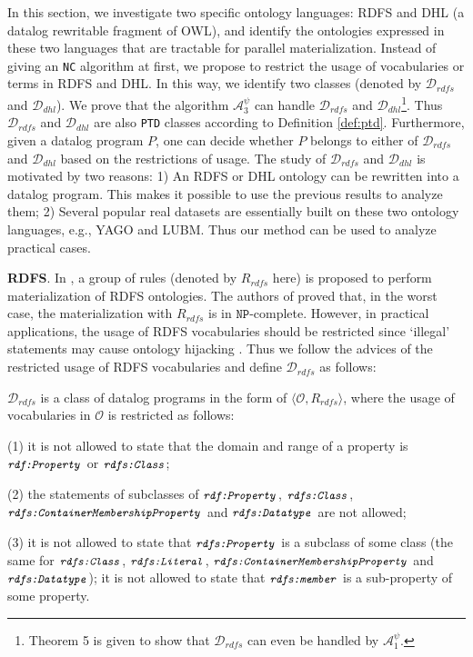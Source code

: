 \documentclass{article}
\begin{document}
In this section, we investigate two specific ontology languages: RDFS and DHL (a datalog rewritable fragment of OWL),
and identify the ontologies expressed in these two languages that are tractable for parallel materialization. Instead
of giving an \texttt{NC} algorithm at first, we propose to restrict the usage of vocabularies or terms in RDFS and DHL. In this way, we identify two classes (denoted by $\mathcal{D}_{rdfs}$ and $\mathcal{D}_{dhl}$). We prove that the algorithm $\mathcal{A}_3^{\psi}$ can handle $\mathcal{D}_{rdfs}$ and $\mathcal{D}_{dhl}$\footnote{Theorem 5 is given to show that $\mathcal{D}_{rdfs}$ can even be handled by $\mathcal{A}_1^{\psi}$.}. Thus $\mathcal{D}_{rdfs}$ and $\mathcal{D}_{dhl}$ are also \texttt{PTD} classes according to Definition \ref{def:ptd}. Furthermore, given a
datalog program $P$, one can decide whether $P$ belongs to either of $\mathcal{D}_{rdfs}$ and $\mathcal{D}_{dhl}$ based on
the restrictions of usage. The study of $\mathcal{D}_{rdfs}$ and $\mathcal{D}_{dhl}$ is motivated by two reasons: 1) An RDFS or DHL ontology can be rewritten into a datalog program. This makes it possible to use the previous results to analyze them; 2) Several popular real datasets are essentially
built on these two ontology languages, e.g., YAGO and LUBM. Thus our method can be used to analyze practical cases.

\textbf{RDFS}. In \cite{rdfSemantic},
a group of rules (denoted by $R_{rdfs}$ here) is proposed to perform materialization of RDFS ontologies.
The authors of \cite{DBLP:journals/ws/Horst05}
proved that, in the worst case, the materialization with $R_{rdfs}$ is in $\texttt{NP}$-complete. However, in practical applications, the usage of RDFS vocabularies should be restricted since `illegal' statements may cause ontology
hijacking \cite{DBLP:journals/ijswis/HoganHP09}. Thus we follow the advices \cite{DBLP:journals/ijswis/HoganHP09}
of the restricted usage of RDFS vocabularies and
define $\mathcal{D}_{rdfs}$ as follows:

\begin{definition}\label{def:drdfs} $\mathcal{D}_{rdfs}$ is a class of datalog programs in the form
of $\langle\mathcal{O}, R_{rdfs}\rangle$, where the usage of vocabularies
in $\mathcal{O}$ is restricted as follows:

(1) it is not allowed to state that the domain and range of a property is $\small\texttt{\emph{rdf:Property}}$
or $\small\texttt{\emph{rdfs:Class}}$;

(2) the statements of subclasses of $\small\texttt{\emph{rdf:Property}}$,
$\small\texttt{\emph{rdfs:Class}}$, $\small\texttt{\emph{rdfs:ContainerMembershipProperty}}$
and $\small\texttt{\emph{rdfs:Datatype}}$ are not allowed;

(3) it is not allowed to state that $\small\texttt{\emph{rdfs:Property}}$ is a subclass of some class
(the same for $\small\texttt{\emph{rdfs:Class}}$, $\small\texttt{\emph{rdfs:Literal}}$, $\small\texttt{\emph{rdfs:ContainerMembershipProperty}}$ and $\small\texttt{\emph{rdfs:Datatype}}$);
it is not allowed to state that $\small\texttt{\emph{rdfs:member}}$ is a sub-property of some property.
\end{definition}
\end{document}
